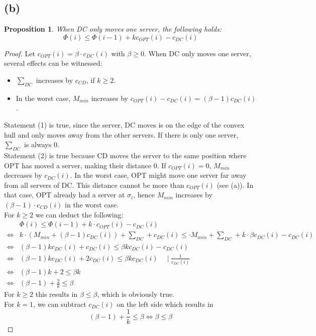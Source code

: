 \documentclass[a4paper,12pt]{scrartcl}
\newcounter{sheet}
\newtheorem{proposition}{Proposition}[sheet]
\begin{document}
\subsection*{(b)}
\begin{proposition}
When DC only moves one server, the following holds:
\[\Phi(i) \leq \Phi(i-1) + k c_{OPT}(i) - c_{DC}(i)\]
\end{proposition}
\begin{proof}
Let $c_{OPT}(i) = \beta \cdot c_{DC}(i)$ with $\beta \geq 0$.
When DC only moves one server, several effects can be witnessed: \\
\begin{itemize}
\item[(1)]$\sum_{DC}$ increases by $c_{CD}$, if $k \geq 2$. \\
\item[(2)] In the worst case, $M_{min}$ increases by $c_{OPT}(i)-c_{DC}(i) = (\beta-1)c_{DC}(i)$. \\
\end{itemize}
Statement (1) is true, since the server, DC moves is on the edge of the convex hull and only moves away from the other servers. If there is only one server, $\sum_{DC}$ is always $0$. \\
Statement (2) is true because CD moves the server to the same position where OPT has moved a server, making their distance $0$. If $c_{OPT}(i) = 0$, $M_{min}$ decreases by $c_{DC}(i)$. In the worst case, OPT might move one server far away from all servers of DC. This distance cannot be more than $c_{OPT}(i)$ (see (a)). In that case, OPT already had a server at $\sigma_i$, hence $M_{min}$ increases by $(\beta-1)\cdot c_{CD}(i)$ in the worst case. \\
For $k\geq 2$ we can deduct the following: \\
\begin{align*}
& \Phi(i) \leq  \Phi(i-1) + k \cdot c_{OPT}(i) - c_{DC}(i) \\
\Leftrightarrow & k \cdot (M_{min} + (\beta-1) c_{DC}(i)) + \sum_{DC} + c_{DC}(i) \leq  \cdot M_{min} + \sum_{DC} + k \cdot \beta c_{DC}(i) - c_{DC}(i) \\
\Leftrightarrow &(\beta-1)kc_{DC}(i) + c_{DC}(i) \leq \beta k c_{DC}(i) - c_{DC}(i) \\
\Leftrightarrow &(\beta-1)kc_{DC}(i) + 2c_{DC}(i) \leq \beta k c_{DC}(i)\quad \mid \frac{1}{c_{DC}(i)} \\
\Leftrightarrow &(\beta-1)k + 2  \leq \beta k  \\
\Leftrightarrow &(\beta-1) + \frac{2}{k} \leq \beta
\end{align*}
For $k\geq 2$ this results in $\beta \leq \beta$, which is obviously true. \\
For $k=1$, we can subtract $c_{DC}(i)$ on the left side which results in 
\[(\beta-1) + \frac{1}{k} \leq \beta \Leftrightarrow \beta \leq \beta\]
\end{proof}
\pagebreak
\end{document}
